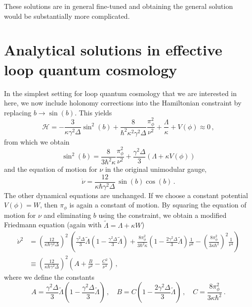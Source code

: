 \documentclass[aps,prd,11pt,showkeys,nofootinbib]{revtex4-2}
\begin{document}
These solutions are in general fine-tuned and obtaining the general solution would be substantially more complicated.

\section{Analytical solutions in effective loop quantum cosmology}
\label{effectivesol}

In the simplest setting for loop quantum cosmology that we are interested in here, we now include holonomy corrections into the Hamiltonian constraint by replacing $b\rightarrow\sin(b)$. This yields
\begin{equation}
    \mathcal{H} = -\frac{3}{\kappa\gamma^2\Delta} \sin^2(b)+\frac{8}{\hbar^2 \kappa^2  \gamma^2 \Delta} \frac{\pi_\phi^2}{\nu^2}+ \frac{\Lambda}{\kappa} +V(\phi) \approx 0\,,
\end{equation}
from which we obtain
\begin{equation}\label{eq:sinb_constraint}
    \sin^2(b) = \frac{8}{3 \hbar^2\kappa } \frac{\pi_\phi^2}{\nu^2}+\frac{\gamma^2\Delta}{3} \left(\Lambda + \kappa V(\phi)\right)
\end{equation}
and the equation of motion for $\nu$ in the original unimodular gauge,
\begin{equation}
    \dot \nu = \frac{12}{\kappa \hbar\gamma^2\Delta}\, \sin(b)\cos(b)\,.
\end{equation}
The other dynamical equations are unchanged. If we choose a constant potential $V(\phi)=W$, then $\pi_\phi$ is again a constant of motion. By squaring the equation of motion for $\nu$ and eliminating $b$ using the constraint, we obtain a modified Friedmann equation (again with $\tilde\Lambda=\Lambda+\kappa W$)
\begin{align}
    \dot \nu^2 &= \left(\frac{12}{\kappa \hbar\gamma^2\Delta}\right)^2\ \left(\frac{\gamma^2\Delta}{3}\tilde{\Lambda}\left(1-\frac{\gamma^2\Delta}{3}\tilde{\Lambda}\right)+\frac{8\pi_\phi^2}{3 \hbar^2 \kappa }\left(1-\frac{2\gamma^2 \Delta}{3}\tilde{\Lambda}\right) \frac{1}{\nu^2}-\left(\frac{8\pi_\phi^2}{3 \kappa \hbar^2}\right)^2\frac{1}{\nu^4}\right)\nonumber\\
    &\equiv \left(\frac{12}{\kappa \hbar\gamma^2\Delta}\right)^2 \left(A+\frac{B}{\nu^2}-\frac{C^2}{\nu^4}\right)\,,
\end{align}
where we define the constants
\begin{equation}
    A = \frac{\gamma^2\Delta}{3}\tilde{\Lambda}\left(1-\frac{\gamma^2\Delta}{3}\tilde{\Lambda}\right)\,,\quad B= C\left(1-\frac{2\gamma^2\Delta}{3}\tilde{\Lambda}\right)\,,\quad C = \frac{8\pi_\phi^2}{3 \kappa \hbar^2}\ . 
\end{equation}
\end{document}
